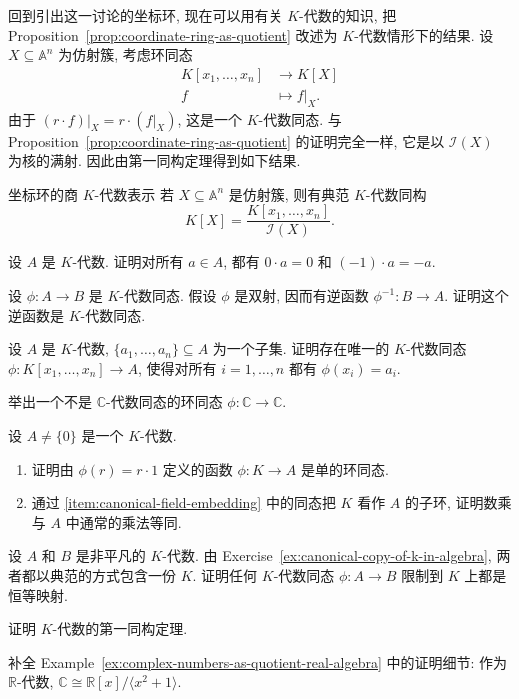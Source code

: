 回到引出这一讨论的坐标环, 现在可以用有关 $K$-代数的知识, 把 Proposition~\ref{prop:coordinate-ring-as-quotient} 改述为 $K$-代数情形下的结果. 设 $X\subseteq\mathbb{A}^{n}$ 为仿射簇, 考虑环同态
\[
  \begin{aligned}
    K[x_{1},\ldots,x_{n}]&\to K[X]\\
    f&\mapsto f|_{X}.
  \end{aligned}
\]
由于 $(r\cdot f)|_{X}=r\cdot(f|_{X})$, 这是一个 $K$-代数同态. 与 Proposition~\ref{prop:coordinate-ring-as-quotient} 的证明完全一样, 它是以 $\mathcal{I}(X)$ 为核的满射. 因此由第一同构定理得到如下结果.

\begin{Proposition}{坐标环的商 $K$-代数表示}\leavevmode\label{prop:coordinate-ring-as-quotient-k-algebra}
  若 $X\subseteq\mathbb{A}^{n}$ 是仿射簇, 则有典范 $K$-代数同构
  \[
    K[X]=\frac{K[x_{1},\ldots,x_{n}]}{\mathcal{I}(X)}.
  \]
\end{Proposition}

\BookExerciseHeading
\begin{BookExercises}
  \item\label{ex:zero-and-negative-one-scalar-action} 设 $A$ 是 $K$-代数. 证明对所有 $a\in A$, 都有 $0\cdot a=0$ 和 $(-1)\cdot a=-a$.
  \item\label{ex:bijective-k-algebra-homomorphism-is-isomorphism} 设 $\phi:A\to B$ 是 $K$-代数同态. 假设 $\phi$ 是双射, 因而有逆函数 $\phi^{-1}:B\to A$. 证明这个逆函数是 $K$-代数同态.
  \item\label{ex:polynomial-ring-map-determined-by-generators} 设 $A$ 是 $K$-代数, $\{a_{1},\ldots,a_{n}\}\subseteq A$ 为一个子集. 证明存在唯一的 $K$-代数同态 $\phi:K[x_{1},\ldots,x_{n}]\to A$, 使得对所有 $i=1,\ldots,n$ 都有 $\phi(x_{i})=a_{i}$.
  \item\label{ex:ring-homomorphism-not-complex-algebra-homomorphism} 举出一个不是 $\mathbb{C}$-代数同态的环同态 $\phi:\mathbb{C}\to\mathbb{C}$.
  \item\label{ex:canonical-copy-of-k-in-algebra} 设 $A\ne\{0\}$ 是一个 $K$-代数.
    \begin{enumerate}[label=(\alph*),ref=(\alph*)]
      \item\label{item:canonical-field-embedding} 证明由 $\phi(r)=r\cdot1$ 定义的函数 $\phi:K\to A$ 是单的环同态.
      \item 通过 \ref{item:canonical-field-embedding} 中的同态把 $K$ 看作 $A$ 的子环, 证明数乘与 $A$ 中通常的乘法等同.
    \end{enumerate}
  \item\label{ex:k-algebra-homomorphism-restricts-to-identity} 设 $A$ 和 $B$ 是非平凡的 $K$-代数. 由 Exercise~\ref{ex:canonical-copy-of-k-in-algebra}, 两者都以典范的方式包含一份 $K$. 证明任何 $K$-代数同态 $\phi:A\to B$ 限制到 $K$ 上都是恒等映射.
  \item\label{ex:prove-first-isomorphism-theorem-k-algebras} 证明 $K$-代数的第一同构定理.
  \item\label{ex:verify-complex-quotient-real-algebra} 补全 Example~\ref{ex:complex-numbers-as-quotient-real-algebra} 中的证明细节: 作为 $\mathbb{R}$-代数, $\mathbb{C}\cong\mathbb{R}[x]/\langle x^{2}+1\rangle$.
\end{BookExercises}
